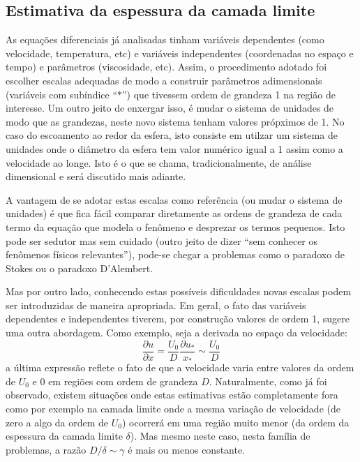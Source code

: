 \subsection{Estimativa da espessura da camada limite}
As equações diferenciais já analisadas tinham variáveis dependentes (como velocidade, temperatura, etc) e variáveis independentes (coordenadas no espaço e tempo) e parâmetros (viscosidade, etc). Assim, o procedimento adotado foi escolher escalas adequadas de modo a construir parâmetros adimensionais (variáveis com subíndice ``$*$'') que tivessem ordem de grandeza 1 na região de interesse. Um outro jeito de enxergar isso, é mudar o sistema de unidades de modo que as grandezas, neste novo sistema tenham valores própximos de 1. No caso do escoamento ao redor da esfera, isto consiste em utilzar um sistema de unidades onde o diâmetro da esfera tem valor numérico igual a 1 assim como a velocidade ao longe. Isto é o que se chama, tradicionalmente, de análise dimensional e será discutido mais adiante. 

A vantagem de se adotar estas escalas como referência (ou mudar o sistema de unidades) é que fica fácil comparar diretamente as ordens de grandeza de cada termo da equação que modela o fenômeno e desprezar  os termos pequenos. Isto pode ser sedutor mas sem cuidado (outro jeito de dizer ``sem conhecer os fenômenos físicos relevantes''), pode-se chegar a problemas como o paradoxo de Stokes ou o paradoxo D'Alembert. 

Mas por outro lado, conhecendo estas possíveis dificuldades novas escalas podem ser introduzidas de maneira apropriada. Em geral, o fato das variáveis dependentes e independentes tiverem, por construção valores de ordem 1, sugere uma outra abordagem. Como exemplo, seja a derivada no espaço da velocidade:
\[
\frac{\partial u}{\partial x} = \frac{U_0}{D}\frac{\partial u_*}{x_*} \sim \frac{U_0}{D}
\]
a última expressão reflete o fato de que a velocidade varia entre valores da ordem de $U_0$ e $0$ em regiões com ordem de grandeza $D$. Naturalmente, como já foi observado,  existem situações onde estas estimativas estão completamente fora como por exemplo na camada limite onde a mesma variação de velocidade (de zero a algo da ordem de $U_0$) ocorrerá em uma região muito menor (da ordem da espessura da camada limite $\delta$). Mas mesmo neste caso, nesta família de problemas, a razão $D/\delta\sim\gamma$ é mais ou menos constante. 

